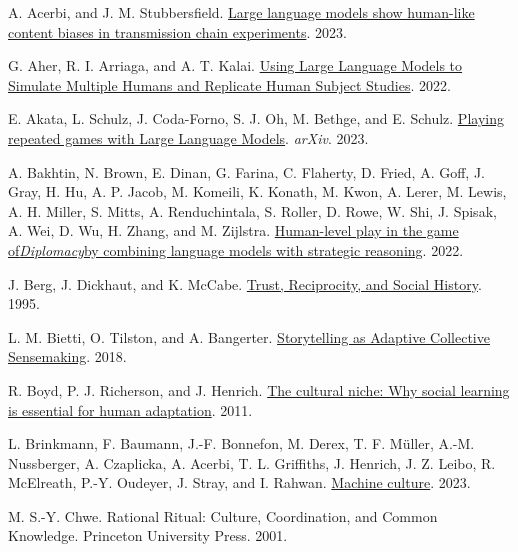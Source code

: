 \documentclass[
  10pt,
  letterpaper,
]{article}
\newlength{\cslhangindent}
\newenvironment{CSLReferences}[2] %
 {\begin{list}{}{%
  \setlength{\itemindent}{0pt}
  \setlength{\leftmargin}{0pt}
  \setlength{\parsep}{0pt}
  \ifodd #1
   \setlength{\leftmargin}{\cslhangindent}
   \setlength{\itemindent}{-1\cslhangindent}
  \fi
  \setlength{\itemsep}{#2\baselineskip}}}
 {\end{list}}
\begin{document}
\protect{}\label{refs}
\begin{CSLReferences}{1}{0}
A. Acerbi, and J. M. Stubbersfield.
\href{https://doi.org/10.1073/pnas.2313790120}{Large language models
show human-like content biases in transmission chain experiments}. 2023.

G. Aher, R. I. Arriaga, and A. T. Kalai.
\href{https://doi.org/10.48550/ARXIV.2208.10264}{Using Large Language
Models to Simulate Multiple Humans and Replicate Human Subject Studies}.
2022.

E. Akata, L. Schulz, J. Coda-Forno, S. J. Oh, M. Bethge, and E. Schulz.
\href{https://doi.org/10.48550/ARXIV.2305.16867}{Playing repeated games
with Large Language Models}. \emph{arXiv}. 2023.

A. Bakhtin, N. Brown, E. Dinan, G. Farina, C. Flaherty, D. Fried, A.
Goff, J. Gray, H. Hu, A. P. Jacob, M. Komeili, K. Konath, M. Kwon, A.
Lerer, M. Lewis, A. H. Miller, S. Mitts, A. Renduchintala, S. Roller, D.
Rowe, W. Shi, J. Spisak, A. Wei, D. Wu, H. Zhang, and M. Zijlstra.
\href{https://doi.org/10.1126/science.ade9097}{Human-level play in the
game of\emph{Diplomacy}by combining language models with strategic
reasoning}. 2022.

J. Berg, J. Dickhaut, and K. McCabe.
\href{https://doi.org/10.1006/game.1995.1027}{Trust, Reciprocity, and
Social History}. 1995.

L. M. Bietti, O. Tilston, and A. Bangerter.
\href{https://doi.org/10.1111/tops.12358}{Storytelling as Adaptive
Collective Sensemaking}. 2018.

R. Boyd, P. J. Richerson, and J. Henrich.
\href{https://doi.org/10.1073/pnas.1100290108}{The cultural niche: Why
social learning is essential for human adaptation}. 2011.

L. Brinkmann, F. Baumann, J.-F. Bonnefon, M. Derex, T. F. Müller, A.-M.
Nussberger, A. Czaplicka, A. Acerbi, T. L. Griffiths, J. Henrich, J. Z.
Leibo, R. McElreath, P.-Y. Oudeyer, J. Stray, and I. Rahwan.
\href{https://doi.org/10.1038/s41562-023-01742-2}{Machine culture}.
2023.

M. S.-Y. Chwe. Rational Ritual: Culture, Coordination, and Common
Knowledge. Princeton University Press. 2001.


\end{CSLReferences}
\end{document}
